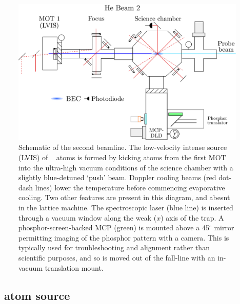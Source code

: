 	\begin{figure}
		\centering
		\includegraphics[width=\textwidth]{fig/apparatus/vacuum_schematic_split_2}
		\caption{Schematic of the second beamline. The low-velocity intense source (LVIS) of \mhe~ atoms is formed by kicking atoms from the first MOT into the ultra-high vacuum conditions of the science chamber with a slightly blue-detuned `push' beam. Doppler cooling beams (red dot-dash lines) lower the temperature before commencing evaporative cooling. Two other features are present in this diagram, and abesnt in the lattice machine. The spectroscopic laser (blue line) is inserted through a vacuum window along the weak ($x$) axis of the trap. A phosphor-screen-backed MCP (green) is mounted above a 45$^\circ$ mirror permitting imaging of the phosphor pattern with a camera. This is typically used for troubleshooting and alignment rather than scientific purposes, and so is moved out of the fall-line with an in-vacuum translation mount. }
		\label{fig:apparatus_2}
	\end{figure}
	

\subsection*{\mhe~atom source}

